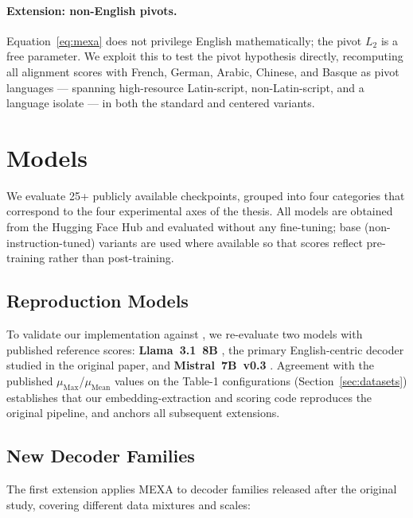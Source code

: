\paragraph{Extension: non-English pivots.}
Equation~\eqref{eq:mexa} does not privilege English mathematically; the
pivot $L_2$ is a free parameter. We exploit this to test the pivot
hypothesis directly, recomputing all alignment scores with French, German,
Arabic, Chinese, and Basque as pivot languages --- spanning high-resource
Latin-script, non-Latin-script, and a language isolate --- in both the
standard and centered variants.

\section{Models}
\label{sec:models}

We evaluate 25+ publicly available checkpoints, grouped into four
categories that correspond to the four experimental axes of the thesis.
All models are obtained from the Hugging Face Hub and evaluated without
any fine-tuning; base (non-instruction-tuned) variants are used where
available so that scores reflect pre-training rather than post-training.

\subsection{Reproduction Models}
\label{subsec:reproduction-models}

To validate our implementation against \citet{kargaran2025mexa}, we
re-evaluate two models with published reference scores:
\textbf{Llama~3.1~8B} \citep{dubey2024llama3}, the primary English-centric
decoder studied in the original paper, and \textbf{Mistral~7B~v0.3}
\citep{jiang2023mistral}. Agreement with the published
$\mu_{\text{Max}}$/$\mu_{\text{Mean}}$ values on the Table-1
configurations (Section~\ref{sec:datasets}) establishes that our
embedding-extraction and scoring code reproduces the original pipeline,
and anchors all subsequent extensions.

\subsection{New Decoder Families}
\label{subsec:new-decoders}

The first extension applies MEXA to decoder families released after the
original study, covering different data mixtures and scales:

